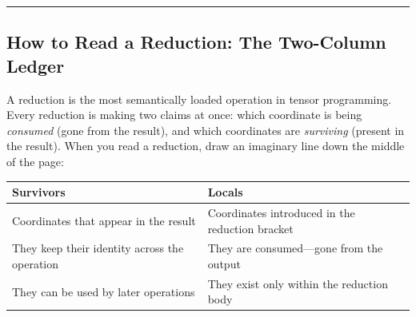 \documentclass[11pt,]{article}
\begin{document}
\begin{center}\rule{0.5\linewidth}{0.4pt}\end{center}

\hypertarget{how-to-read-a-reduction-the-two-column-ledger}{%
\subsection{How to Read a Reduction: The Two-Column
Ledger}\label{how-to-read-a-reduction-the-two-column-ledger}}

A reduction is the most semantically loaded operation in tensor
programming. Every reduction is making two claims at once: which
coordinate is being \emph{consumed} (gone from the result), and which
coordinates are \emph{surviving} (present in the result). When you read
a reduction, draw an imaginary line down the middle of the page:

\begin{longtable}[]{@{}ll@{}}
\toprule
\begin{minipage}[b]{0.54\columnwidth}\raggedright
Survivors\strut
\end{minipage} & \begin{minipage}[b]{0.40\columnwidth}\raggedright
Locals\strut
\end{minipage}\tabularnewline
\midrule
\endhead
\begin{minipage}[t]{0.54\columnwidth}\raggedright
Coordinates that appear in the result\strut
\end{minipage} & \begin{minipage}[t]{0.40\columnwidth}\raggedright
Coordinates introduced in the reduction bracket\strut
\end{minipage}\tabularnewline
\begin{minipage}[t]{0.54\columnwidth}\raggedright
They keep their identity across the operation\strut
\end{minipage} & \begin{minipage}[t]{0.40\columnwidth}\raggedright
They are consumed---gone from the output\strut
\end{minipage}\tabularnewline
\begin{minipage}[t]{0.54\columnwidth}\raggedright
They can be used by later operations\strut
\end{minipage} & \begin{minipage}[t]{0.40\columnwidth}\raggedright
They exist only within the reduction body\strut
\end{minipage}\tabularnewline
\bottomrule
\end{longtable}
\end{document}

